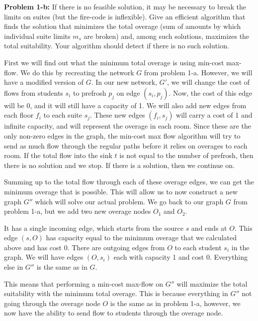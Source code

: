 \documentclass[psamsfonts]{amsart}
\newenvironment{sol}{\vspace{0.25cm}{\large \bfseries Solution:}}{\qedsymbol}
\newenvironment{prob}[1]{\begin{framed}{\large \bfseries Problem #1:}}{\end{framed}}
\begin{document}
\begin{prob}{1-b}
If there is no feasible solution, it may be necessary to break the limits on suites (but the fire-code is inflexible). Give an efficient algorithm that finds the solution that minimizes the total overage (sum of amounts by which individual suite limits $m_s$ are broken) and, among such solutions, maximizes the total suitability. Your algorithm should detect if there is no such solution.
\end{prob}
\begin{sol}
First we will find out what the minimum total overage is using min-cost max-flow. We do this by recreating the network $G$ from problem 1-a. However, we will have a modified version of $G$. In our new network, $G'$, we will change the cost of flows from students $s_i$ to prefrosh $p_j$ on edge $(s_i, p_j)$. Now, the cost of this edge will be 0, and it will still have a capacity of 1. We will also add new edges from each floor $f_i$ to each suite $s_j$. These new edges $(f_i, s_j)$ will carry a cost of 1 and infinite capacity, and will represent the overage in each room. Since these are the only non-zero edges in the graph, the min-cost max flow algorithm will try to send as much flow through the regular paths before it relies on overages to each room. If the total flow into the sink $t$ is not equal to the number of prefrosh, then there is no solution and we stop. If there is a solution, then we continue on.

Summing up to the total flow through each of these overage edges, we can get the minimum overage that is possible. This will allow us to now construct a new graph $G''$ which will solve our actual problem. We go back to our graph $G$ from problem 1-a, but we add two new overage nodes $O_1$ and $O_2$.  

It has a single incoming edge, which starts from the source $s$ and ends at $O$. This edge $(s, O)$ has capacity equal to the minimum overage that we calculated above and has cost 0. There are outgoing edges from $O$ to each student $s_i$ in the graph. We will have edges $(O, s_i)$ each with capacity 1 and cost 0. Everything else in $G''$ is the same as in $G$. 

This means that performing a min-cost max-flow on $G''$ will maximize the total suitability with the minimum total overage. This is because everything in $G''$ not going through the overage node $O$ is the same as in problem 1-a, however, we now have the ability to send flow to students through the overage node. 

\end{sol}
\end{document}
